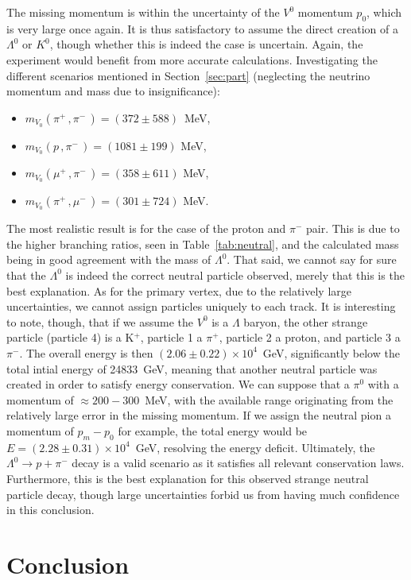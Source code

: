 \documentclass[twocolumn]{article}
\begin{document}
The missing momentum is within the uncertainty of the $V^0$ momentum $p_0$, which is very large once again. It is thus satisfactory to assume the direct creation of a $\Lambda^0$ or $K^0$, though whether this is indeed the case is uncertain. Again, the experiment would benefit from more accurate calculations. Investigating the different scenarios mentioned in Section~\ref{sec:part} (neglecting the neutrino momentum and mass due to insignificance):
\begin{itemize}
	\item $m_{V_0} ( \pi^+ \, , \pi^-\, ) = (372 \pm 588) \, $ MeV,
	\item $m_{V_0} ( p \, , \pi^- \, ) = (1081 \pm 199) $ MeV,
	\item $m_{V_0} ( \mu^+ \, , \pi^- \, ) = (358 \pm 611)$ MeV,
	\item $m_{V_0} ( \pi^+ \, , \mu^- \, ) = (301 \pm 724 )$ MeV.
\end{itemize}
The most realistic result is for the case of the proton and $\pi^-$ pair. This is due to the higher branching ratios, seen in Table~\ref{tab:neutral}, and the calculated mass being in good agreement with the mass of $\Lambda^0$. That said, we cannot say for sure that the $\Lambda^0$ is indeed the correct neutral particle observed, merely that this is the best explanation. As for the primary vertex, due to the relatively large uncertainties, we cannot assign particles uniquely to each track. It is interesting to note, though, that if we assume the $V^0$ is a $\Lambda$ baryon, the other strange particle (particle 4) is a K$^+$, particle 1 a $\pi^+$, particle 2 a proton, and particle 3 a $\pi^-$. The overall energy is then $(2.06 \pm 0.22)\times 10^4$~GeV, significantly below the total intial energy of 24833~GeV, meaning that another neutral particle was created in order to satisfy energy conservation. We can suppose that a $\pi^0$ with a momentum of $\approx 200-300$~MeV, with the available range originating from the relatively large error in the missing momentum. If we assign the neutral pion a momentum of $p_m - p_0$ for example, the total energy would be $E = (2.28 \pm 0.31) \times 10^4$~GeV, resolving the energy deficit. Ultimately, the $\Lambda^0 \to p + \pi^-$ decay is a valid scenario as it satisfies all relevant conservation laws. Furthermore, this is the best explanation for this observed strange neutral particle decay, though large uncertainties forbid us from having much confidence in this conclusion.

\section{Conclusion}
\end{document}

